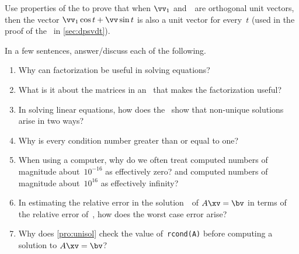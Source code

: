\begin{exercise} \label{ex:univec} 
Use properties of the  to prove that when \(\vv_1\) and~\vv\ are orthogonal unit vectors, then the vector \(\vv_1\cos t+\vv\sin t\) is also a unit vector for every~\(t\)  (used in the proof of the \svd\ in \cref{sec:dpsvdt}).
\end{exercise}






\begin{exercise}  
In a few sentences, answer\slash discuss each of the following.
\begin{enumerate}
\item Why can factorization be useful in solving equations?

\item What is it about the matrices in an \svd\ that makes the factorization useful?

\item In solving linear equations, how does the \svd\ show that non-unique solutions arise in two ways?

\item Why is every condition number greater than or equal to one?

\item When using a computer, why do we often treat computed numbers of magnitude about~\(10^{-16}\) as effectively zero? and computed numbers of magnitude about~\(10^{16}\) as effectively infinity?

\item In estimating the relative error in the solution~\xv\ of \(A\xv=\bv\) in terms of the relative error of~\bv, how does the worst case error arise?

\item Why does \cref{pro:unisol} check the value of~\verb|rcond(A)| before computing a solution to \(A\xv=\bv\)?

\end{enumerate}
\end{exercise}

